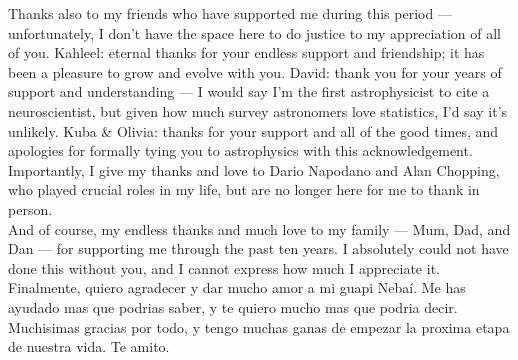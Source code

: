 \newpage
\thispagestyle{empty}
Thanks also to my friends who have supported me during this period --- unfortunately, I don't have the space here to do justice to my appreciation of all of you. Kahleel: eternal thanks for your endless support and friendship; it has been a pleasure to grow and evolve with you. David: thank you for your years of support and understanding --- I would say I'm the first astrophysicist to cite a neuroscientist, but given how much survey astronomers love statistics, I'd say it's unlikely. Kuba \& Olivia: thanks for your support and all of the good times, and apologies for formally tying you to astrophysics with this acknowledgement. Importantly, I give my thanks and love to Dario Napodano and Alan Chopping, who played crucial roles in my life, but are no longer here for me to thank in person. \\

And of course, my endless thanks and much love to my family --- Mum, Dad, and Dan --- for supporting me through the past ten years. I absolutely could not have done this without you, and I cannot express how much I appreciate it. \\

Finalmente, quiero agradecer y dar mucho amor a mi guapi Nebaí. Me has ayudado mas que podrias saber, y te quiero mucho mas que podria decir. Muchisimas gracias por todo, y tengo muchas ganas de empezar la proxima etapa de nuestra vida. Te amito.